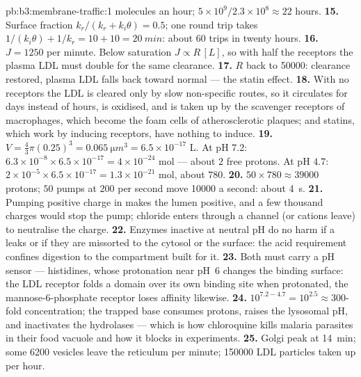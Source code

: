 \begin{solution}{pb:b3:membrane-traffic:1}
molecules an hour; $5\times 10^{9}/2.3\times 10^{8} \approx 22$ hours.
\textbf{15.} Surface fraction $k_{r}/(k_{r} + k_{i}\theta) = 0.5$; one
round trip takes $1/(k_{i}\theta) + 1/k_{r} = 10 + 10 = \qty{20}{min}$:
about $60$ trips in twenty hours.
\textbf{16.} $J = 1250$ per minute. Below saturation $J \propto R\,[L]$,
so with half the receptors the plasma LDL must double for the same
clearance.
\textbf{17.} $R$ back to \num{50000}: clearance restored, plasma LDL
falls back toward normal --- the statin effect.
\textbf{18.} With no receptors the LDL is cleared only by slow
non-specific routes, so it circulates for days instead of hours, is
oxidised, and is taken up by the scavenger receptors of macrophages,
which become the foam cells of atherosclerotic plaques; and statins,
which work by inducing receptors, have nothing to induce.
\textbf{19.} $V = \tfrac{4}{3}\pi(0.25)^{3} = \qty{0.065}{\micro m^3} =
6.5\times 10^{-17}$ L. At pH $7.2$: $6.3\times 10^{-8}\times 6.5\times
10^{-17} = 4\times 10^{-24}$ mol --- about $2$ free protons. At pH $4.7$:
$2\times 10^{-5}\times 6.5\times 10^{-17} = 1.3\times 10^{-21}$ mol,
about $780$.
\textbf{20.} $50\times 780 \approx \num{39000}$ protons; $50$ pumps at
$200$ per second move \num{10000} a second: about \qty{4}{s}.
\textbf{21.} Pumping positive charge in makes the lumen positive, and a
few thousand charges would stop the pump; chloride enters through a
channel (or cations leave) to neutralise the charge.
\textbf{22.} Enzymes inactive at neutral pH do no harm if a 
leaks or if they are missorted to the cytosol or the surface: the acid
requirement confines digestion to the compartment built for it.
\textbf{23.} Both must carry a pH sensor --- histidines, whose
protonation near pH~6 changes the binding surface: the LDL receptor
folds a domain over its own binding site when protonated, the
mannose-6-phosphate receptor loses affinity likewise.
\textbf{24.} $10^{7.2 - 4.7} = 10^{2.5} \approx 300$-fold concentration;
the trapped base consumes protons, raises the lysosomal pH, and
inactivates the hydrolases --- which is how chloroquine kills malaria
parasites in their food vacuole and how it blocks  in
experiments.
\textbf{25.} Golgi peak at \qty{14}{min}; some \num{6200} vesicles leave
the reticulum per minute; \num{150000} LDL particles taken up per
hour.
\end{solution}
